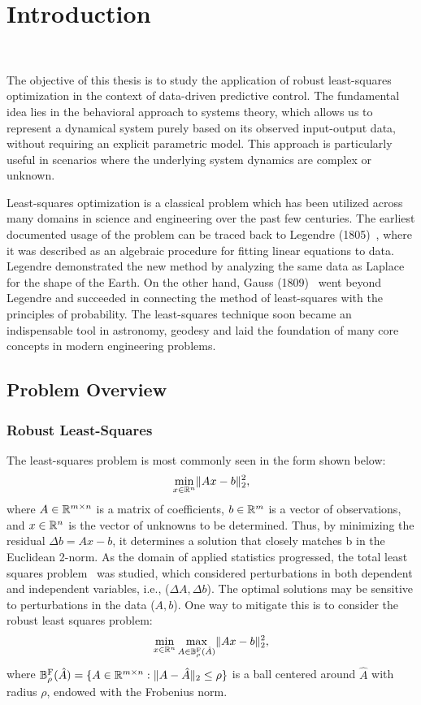 \chapter{Introduction}~\label{ch:Introduction}

The objective of this thesis is to study the application of robust least-squares optimization in the context of data-driven predictive control. The fundamental idea lies in the behavioral approach to systems theory, which allows us to represent a dynamical system purely based on its observed input-output data, without requiring an explicit parametric model. This approach is particularly useful in scenarios where the underlying system dynamics are complex or unknown. 

Least-squares optimization is a classical problem which has been utilized across many domains in science and engineering over the past few centuries. The earliest documented usage of the problem can be traced back to Legendre (1805)~\cite{Legendre1805}, where it was described as an algebraic procedure for fitting linear equations to data. Legendre demonstrated the new method by analyzing the same data as Laplace for the shape of the Earth. On the other hand, Gauss (1809)~\cite{Gauss1809} went beyond Legendre and succeeded in connecting the method of least-squares with the principles of probability. The least-squares technique soon became an indispensable tool in astronomy, geodesy and laid the foundation of many core concepts in modern engineering problems.

\section{Problem Overview}
\subsection{Robust Least-Squares}

The least-squares problem is most commonly seen in the form shown below:
\begin{equation}
    \min_{x \in \mathbb{R}^n} \lVert A x - b \rVert_2^2,
\end{equation}
where $A \in \mathbb{R}^{m \times n}$ is a matrix of coefficients, $b \in \mathbb{R}^m$ is a vector of observations, and $x \in \mathbb{R}^n$ is the vector of unknowns to be determined. Thus, by minimizing the residual $\Delta b = A x - b$, it determines a solution that closely matches b in the Euclidean 2-norm. As the domain of applied statistics progressed, the total least squares problem~\cite{golub1980} was studied, which considered perturbations in both dependent and independent variables, i.e., ($\Delta A, \Delta b$). The optimal solutions may be sensitive to perturbations in the data ($A, b$). One way to mitigate this is to consider the robust least squares problem:
\begin{equation}
    \min_{x \in \mathbb{R}^n} \max_{A \in \mathbb{B}^{\textrm{F}}_{\rho}(\hat{A})} \lVert Ax - b \rVert_2^2,
\end{equation}
where $\mathbb{B}_{\rho}^{\mathrm{F}}(\hat{A}) = \{ A \in \mathbb{R}^{m \times n} : \lVert A - \hat{A} \rVert_2 \leq \rho \}$ is a ball centered around $\hat{A}$ with radius $\rho$, endowed with the Frobenius norm. 

